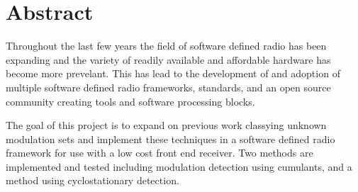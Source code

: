 \chapter{Abstract}

Throughout the last few years the field of software defined radio has been
expanding and the variety of readily available and affordable hardware has
become more prevelant.  This has lead to the development of and adoption of
multiple software defined radio frameworks, standards, and an open source
community creating tools and software processing blocks.  

The goal of this project is to expand on previous work classying unknown
modulation sets and implement these techniques in a software defined radio
framework for use with a low cost front end receiver.  Two methods are
implemented and tested including modulation detection using cumulants, and a
method using cyclostationary detection.
